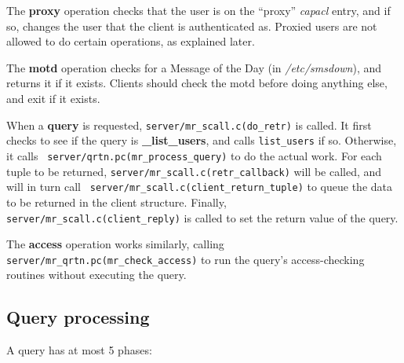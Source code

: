 The {\bf proxy} operation checks that the user is on the ``proxy''
{\it capacl\/} entry, and if so, changes the user that the client is
authenticated as. Proxied users are not allowed to do certain
operations, as explained later.

The {\bf motd} operation checks for a Message of the Day (in {\it
/etc/smsdown\/}), and returns it if it exists. Clients should check
the motd before doing anything else, and exit if it exists.

When a {\bf query} is requested, {\tt server/mr\_scall.c(do\_retr)} is
called. It first checks to see if the query is {\bf \_list\_users},
and calls {\tt list\_users} if so. Otherwise, it calls {\tt
server/qrtn.pc(mr\_process\_query)} to do the actual work. For each
tuple to be returned, {\tt server/mr\_scall.c(retr\_callback)} will be
called, and will in turn call {\tt
server/mr\_scall.c(client\_return\_tuple)} to queue the data to be
returned in the client structure. Finally, {\tt
server/mr\_scall.c(client\_reply)} is called to set the return value
of the query.

The {\bf access} operation works similarly, calling {\tt
server/mr\_qrtn.pc(mr\_check\_access)} to run the query's
access-checking routines without executing the query.

\subsection{Query processing}

A query has at most 5 phases:

